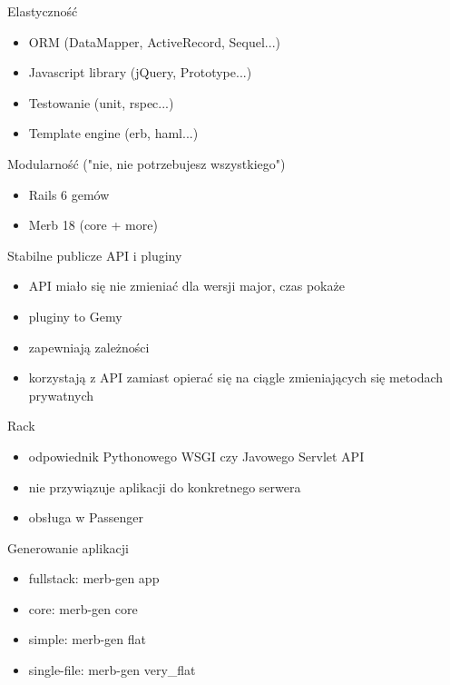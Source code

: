 \documentclass[19pt]{beamer}
\begin{document}
\begin{center}
\begin{frame}
Elastyczność
\begin{itemize}
\item ORM (DataMapper, ActiveRecord, Sequel...)
\item Javascript library (jQuery, Prototype...)
\item Testowanie (unit, rspec...)
\item Template engine (erb, haml...)
\end{itemize}
\end{frame}

\begin{frame}
Modularność ("nie, nie potrzebujesz wszystkiego")
\begin{itemize}
\item Rails 6 gemów
\item Merb 18 (core + more)
\end{itemize}
\end{frame}

\begin{frame}
Stabilne publicze API i pluginy
\begin{itemize}
\item API miało się nie zmieniać dla wersji major, czas pokaże
\item pluginy to Gemy
\item zapewniają zależności
\item korzystają z API zamiast opierać się na ciągle zmieniających się metodach prywatnych
\end{itemize}
\end{frame}

\begin{frame}
Rack
\begin{itemize}
\item odpowiednik Pythonowego WSGI czy Javowego Servlet API
\item nie przywiązuje aplikacji do konkretnego serwera
\item obsługa w Passenger
\end{itemize}
\end{frame}

\begin{frame}
Generowanie aplikacji
\begin{itemize}

\item fullstack: merb-gen app
\item core: merb-gen core
\item simple: merb-gen flat
\item single-file: merb-gen very\_flat


\end{itemize}
\end{frame}
\end{center}
\end{document}
